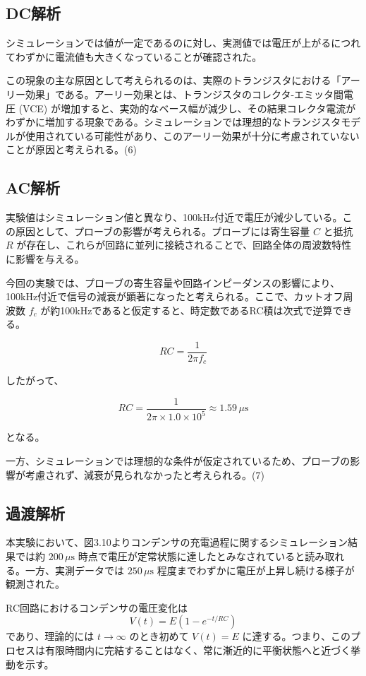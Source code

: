 \documentclass{jlreq}
\numberwithin{equation}{section}
\begin{document}
\subsection{DC解析}
シミュレーションでは値が一定であるのに対し、実測値では電圧が上がるにつれてわずかに電流値も大きくなっていることが確認された。

この現象の主な原因として考えられるのは、実際のトランジスタにおける「アーリー効果」である。アーリー効果とは、トランジスタのコレクタ-エミッタ間電圧 (VCE) が増加すると、実効的なベース幅が減少し、その結果コレクタ電流がわずかに増加する現象である。シミュレーションでは理想的なトランジスタモデルが使用されている可能性があり、このアーリー効果が十分に考慮されていないことが原因と考えられる。(6)

\subsection{AC解析}
実験値はシミュレーション値と異なり、100kHz付近で電圧が減少している。この原因として、プローブの影響が考えられる。プローブには寄生容量 \( C \) と抵抗 \( R \) が存在し、これらが回路に並列に接続されることで、回路全体の周波数特性に影響を与える。

今回の実験では、プローブの寄生容量や回路インピーダンスの影響により、100kHz付近で信号の減衰が顕著になったと考えられる。ここで、カットオフ周波数 \( f_c \) が約100kHzであると仮定すると、時定数であるRC積は次式で逆算できる。

\[
RC = \frac{1}{2\pi f_c}
\]

したがって、

\[
RC = \frac{1}{2\pi \times 1.0 \times 10^5} \approx 1.59\,\mu\mathrm{s}
\]

となる。

一方、シミュレーションでは理想的な条件が仮定されているため、プローブの影響が考慮されず、減衰が見られなかったと考えられる。(7)

\subsection{過渡解析}
本実験において、図3.10よりコンデンサの充電過程に関するシミュレーション結果では約 $200\,\mu\mathrm{s}$ 時点で電圧が定常状態に達したとみなされていると読み取れる。一方、実測データでは $250\,\mu\mathrm{s}$ 程度までわずかに電圧が上昇し続ける様子が観測された。

RC回路におけるコンデンサの電圧変化は
\[
V(t) = E\left(1 - e^{-t/RC}\right)
\]
であり、理論的には $t \to \infty$ のとき初めて $V(t) = E$ に達する。つまり、このプロセスは有限時間内に完結することはなく、常に漸近的に平衡状態へと近づく挙動を示す。
\end{document}
